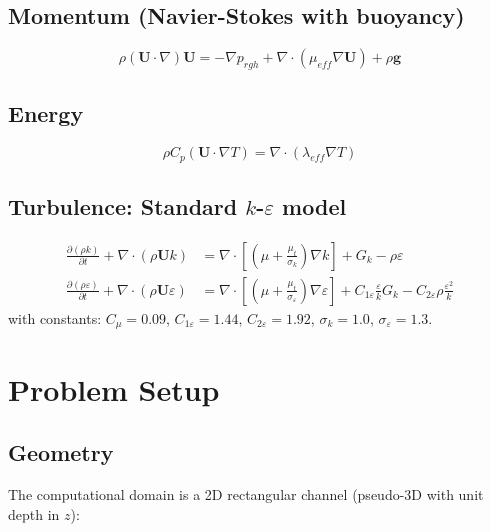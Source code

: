 \documentclass[12pt, a4paper]{article}
\begin{document}
\subsection{Momentum (Navier-Stokes with buoyancy)}
\begin{equation}
    \rho(\mathbf{U} \cdot \nabla)\mathbf{U} = -\nabla p_{rgh} + \nabla \cdot (\mu_{eff} \nabla \mathbf{U}) + \rho \mathbf{g}
\end{equation}

\subsection{Energy}
\begin{equation}
    \rho C_p (\mathbf{U} \cdot \nabla T) = \nabla \cdot (\lambda_{eff} \nabla T)
\end{equation}

\subsection{Turbulence: Standard $k$-$\varepsilon$ model}
\begin{align}
    \frac{\partial(\rho k)}{\partial t} + \nabla \cdot (\rho \mathbf{U} k) &= \nabla \cdot \left[\left(\mu + \frac{\mu_t}{\sigma_k}\right)\nabla k\right] + G_k - \rho\varepsilon \\
    \frac{\partial(\rho\varepsilon)}{\partial t} + \nabla \cdot (\rho \mathbf{U} \varepsilon) &= \nabla \cdot \left[\left(\mu + \frac{\mu_t}{\sigma_\varepsilon}\right)\nabla\varepsilon\right] + C_{1\varepsilon}\frac{\varepsilon}{k}G_k - C_{2\varepsilon}\rho\frac{\varepsilon^2}{k}
\end{align}
with constants: $C_\mu = 0.09$, $C_{1\varepsilon} = 1.44$, $C_{2\varepsilon} = 1.92$, $\sigma_k = 1.0$, $\sigma_\varepsilon = 1.3$.

\section{Problem Setup}

\subsection{Geometry}
The computational domain is a 2D rectangular channel (pseudo-3D with unit depth in $z$):
\end{document}
